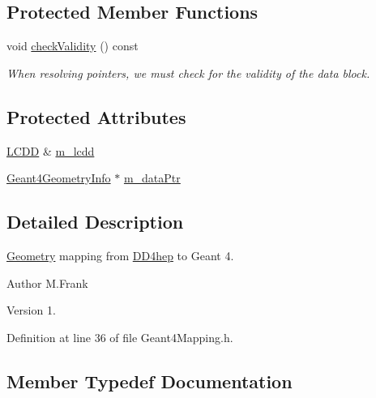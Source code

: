 \subsection*{Protected Member Functions}
\begin{DoxyCompactItemize}
\item 
void \hyperlink{class_d_d4hep_1_1_simulation_1_1_geant4_mapping_a97758739af8c4f4a108d308e73b1ad0e}{check\+Validity} () const
\begin{DoxyCompactList}\small\item\em When resolving pointers, we must check for the validity of the data block. \end{DoxyCompactList}\end{DoxyCompactItemize}
\subsection*{Protected Attributes}
\begin{DoxyCompactItemize}
\item 
\hyperlink{class_d_d4hep_1_1_simulation_1_1_geant4_mapping_a7b098323f9ea570a13d220fe3f09da41}{L\+C\+DD} \& \hyperlink{class_d_d4hep_1_1_simulation_1_1_geant4_mapping_a4c514a5fa835d901c01cf5a860960958}{m\+\_\+lcdd}
\item 
\hyperlink{class_d_d4hep_1_1_simulation_1_1_geant4_geometry_info}{Geant4\+Geometry\+Info} $\ast$ \hyperlink{class_d_d4hep_1_1_simulation_1_1_geant4_mapping_a93f0104487f0ff971b9b72777e287c75}{m\+\_\+data\+Ptr}
\end{DoxyCompactItemize}


\subsection{Detailed Description}
\hyperlink{namespace_d_d4hep_1_1_geometry}{Geometry} mapping from \hyperlink{namespace_d_d4hep}{D\+D4hep} to Geant 4. 

\begin{DoxyAuthor}{Author}
M.\+Frank 
\end{DoxyAuthor}
\begin{DoxyVersion}{Version}
1. 
\end{DoxyVersion}


Definition at line 36 of file Geant4\+Mapping.\+h.



\subsection{Member Typedef Documentation}
\hypertarget{class_d_d4hep_1_1_simulation_1_1_geant4_mapping_aa33a3f44904c6184ee883c244baa9554}{}\label{class_d_d4hep_1_1_simulation_1_1_geant4_mapping_aa33a3f44904c6184ee883c244baa9554} 
